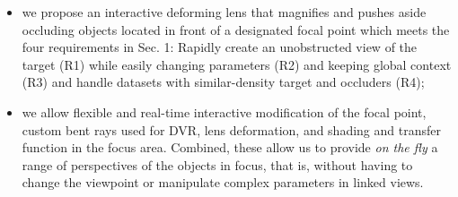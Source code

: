 \begin{itemize}
\item  we propose an interactive deforming lens that magnifies and pushes aside occluding objects located in front of a designated focal point which meets the four requirements in Sec. 1: 
Rapidly create an unobstructed view of the target (R1) while easily changing parameters (R2) and keeping global context (R3) and handle datasets with similar-density target and occluders (R4);
\item we allow flexible and real-time interactive modification of the focal point, custom bent rays used for DVR, lens deformation, and shading and transfer function in the focus area. Combined, these allow us to provide \emph{on the fly} a range of perspectives of the objects in focus, that is, without having to change the viewpoint or manipulate complex parameters in linked views.
\end{itemize}


